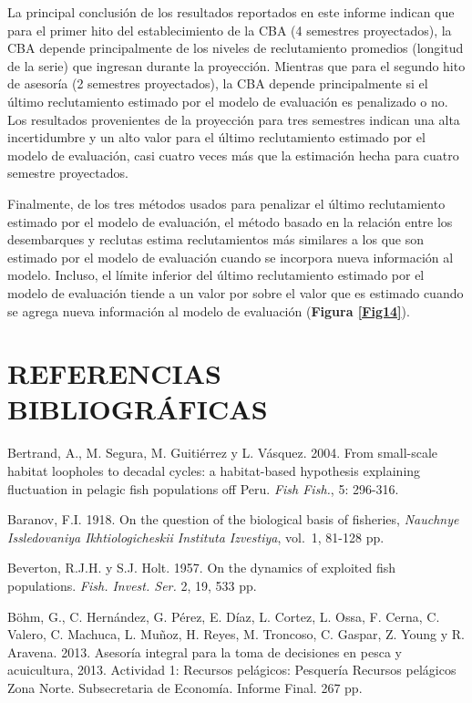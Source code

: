 \documentclass[letter,11pt]{article}
\begin{document}
La principal conclusi\'on de los resultados reportados en este informe indican que para el
primer hito del establecimiento de la CBA (4 semestres proyectados), la CBA depende principalmente
de los niveles de reclutamiento promedios (longitud de la serie) que ingresan durante la proyecci\'on. Mientras que para el segundo hito de asesor\'ia (2 semestres proyectados), la CBA depende 
principalmente si el \'ultimo reclutamiento estimado por el modelo de evaluaci\'on es penalizado o no. 
Los resultados provenientes de la proyecci\'on para tres semestres indican una alta incertidumbre
y un alto valor para el \'ultimo reclutamiento estimado por el modelo de evaluaci\'on, casi cuatro
veces m\'as que la estimaci\'on hecha para cuatro semestre proyectados.

Finalmente, de los tres m\'etodos usados para penalizar el \'ultimo reclutamiento estimado por el
modelo de evaluaci\'on, el m\'etodo basado en la relaci\'on entre los desembarques y reclutas estima reclutamientos m\'as similares a los que son estimado por el modelo de evaluaci\'on cuando se incorpora nueva informaci\'on al modelo. Incluso, el l\'imite inferior del \'ultimo reclutamiento estimado por
el modelo de evaluaci\'on tiende a un valor por sobre el valor que es estimado cuando se agrega
nueva informaci\'on al modelo de evaluaci\'on (\textbf{Figura \ref{Fig14}}).


\pagebreak

\section{REFERENCIAS BIBLIOGR\'AFICAS}

\quad


Bertrand, A., M. Segura, M. Guiti\'errez y L. V\'asquez. 2004. From
small-scale habitat loopholes to decadal cycles: a habitat-based
hypothesis explaining fluctuation in pelagic fish populations off Peru.
\textit{Fish Fish.}, 5: 296-316.

Baranov, F.I. 1918. On the question of the biological basis of
fisheries,
\textit{Nauchnye Issledovaniya Ikhtiologicheskii Instituta Izvestiya},
vol.~1, 81-128 pp.

Beverton, R.J.H. y S.J. Holt. 1957. On the dynamics of exploited fish
populations. \textit{Fish. Invest. Ser.} 2, 19, 533 pp.


B\"ohm, G., C. Hern\'andez, G. P\'erez, E. D\'iaz, L. Cortez, L. Ossa, F. Cerna,
C. Valero, C. Machuca, L. Mu\~{n}oz, H. Reyes, M. Troncoso, C. Gaspar, Z.
Young y R. Aravena. 2013. Asesor\'ia integral para la toma de decisiones
en pesca y acuicultura, 2013. Actividad 1: Recursos pel\'agicos: Pesquer\'ia
Recursos pel\'agicos Zona Norte. Subsecretaria de Econom\'ia. Informe Final.
267 pp.
\end{document}
